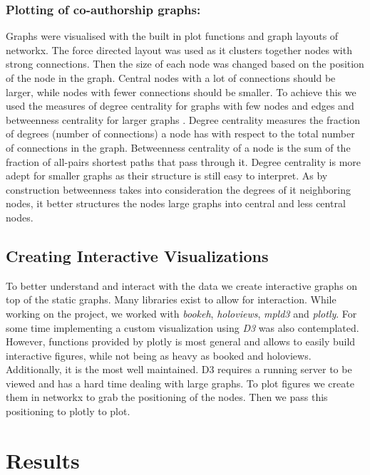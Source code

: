 \documentclass[journal,twocolumn]{IEEEtran}
\begin{document}
    \hypertarget{plotting-of-co-authorship-graphs}{%
\subsubsection{Plotting of co-authorship
graphs:}\label{plotting-of-co-authorship-graphs}}

Graphs were visualised with the built in plot functions and graph
layouts of networkx. The force directed layout was used as it clusters
together nodes with strong connections. Then the size of each node was
changed based on the position of the node in the graph. Central nodes
with a lot of connections should be larger, while nodes with fewer
connections should be smaller. To achieve this we used the measures of
degree centrality for graphs with few nodes and edges and betweenness
centrality for larger graphs . Degree centrality measures the fraction
of degrees (number of connections) a node has with respect to the total
number of connections in the graph. Betweenness centrality of a node is
the sum of the fraction of all-pairs shortest paths that pass through
it. Degree centrality is more adept for smaller graphs as their
structure is still easy to interpret. As by construction betweenness
takes into consideration the degrees of it neighboring nodes, it better
structures the nodes large graphs into central and less central nodes.

    \hypertarget{creating-interactive-visualizations}{%
\subsection{Creating Interactive
Visualizations}\label{creating-interactive-visualizations}}

To better understand and interact with the data we create interactive
graphs on top of the static graphs. Many libraries exist to allow for
interaction. While working on the project, we worked with \emph{bookeh},
\emph{holoviews}, \emph{mpld3} and \emph{plotly}. For some time
implementing a custom visualization using \emph{D3} was also
contemplated. However, functions provided by plotly is most general and
allows to easily build interactive figures, while not being as heavy as
booked and holoviews. Additionally, it is the most well maintained. D3
requires a running server to be viewed and has a hard time dealing with
large graphs. To plot figures we create them in networkx to grab the
positioning of the nodes. Then we pass this positioning to plotly to
plot.

    \hypertarget{results}{%
\section{Results}\label{results}}
\end{document}

